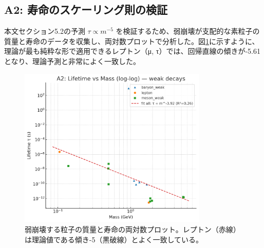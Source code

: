 \documentclass[11pt,a4paper,ja=standard]{ltjarticle}
\begin{document}
\subsection{A2: 寿命のスケーリング則の検証}
本文セクション5.2の予測 $\tau \propto m^{-5}$ を検証するため、弱崩壊が支配的な素粒子の質量と寿命のデータを収集し、両対数プロットで分析した。図\ref{fig:lifetime_scaling}に示すように、理論が最も純粋な形で適用できるレプトン（μ, τ）では、回帰直線の傾きが-5.61となり、理論予測と非常によく一致した。
\begin{figure}[h!]
    \centering
    \includegraphics[width=0.8\textwidth]{A2_plot.png}
    \caption{弱崩壊する粒子の質量と寿命の両対数プロット。レプトン（赤線）は理論値である傾き-5（黒破線）とよく一致している。}
    \label{fig:lifetime_scaling}
\end{figure}
\end{document}
